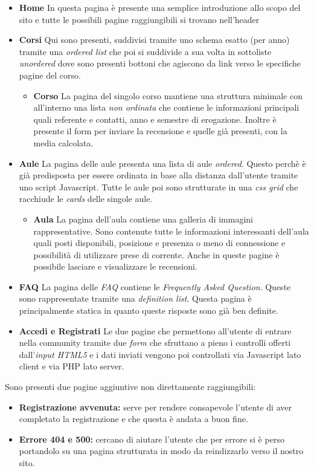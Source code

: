 \begin{itemize}
    \item \textbf{Home} In questa pagina è presente una semplice introduzione allo scopo del sito e tutte le possibili pagine raggiungibili si trovano nell'header
    \item \textbf{Corsi} Qui sono presenti, suddivisi tramite uno schema esatto (per anno) tramite una \textit{ordered list} che poi si suddivide a sua volta in sottoliste \textit{unordered} dove sono presenti bottoni che agiscono da link verso le specifiche pagine del corso.
    \begin{itemize}
        \item \textbf{Corso} La pagina del singolo corso mantiene una struttura minimale con all'interno una lista \textit{non ordinata} che contiene le informazioni principali quali referente e contatti, anno e semestre di erogazione. Inoltre è presente il form per inviare la recensione e quelle già presenti, con la media calcolata.
    \end{itemize}
    \item \textbf{Aule} La pagina delle aule presenta una lista di aule \textit{ordered}. Questo perchè è già predisposta per essere ordinata in base alla distanza dall'utente tramite uno script Javascript. Tutte le aule poi sono strutturate in una \textit{css grid} che racchiude le \textit{cards} delle singole aule.
    \begin{itemize}
        \item \textbf{Aula} La pagina dell'aula contiene una galleria di immagini rappresentative. Sono contenute tutte le informazioni interessanti dell'aula quali posti disponibili, posizione e presenza o meno di connessione e possibilità di utilizzare prese di corrente. Anche in queste pagine è possibile lasciare e visualizzare le recensioni.
    \end{itemize}
    \item \textbf{FAQ} La pagina delle \textit{FAQ} contiene le \textit{Frequently Asked Question}. Queste sono rappresentate tramite una \textit{definition list}. Questa pagina è principalmente statica in quanto queste risposte sono già ben definite.
    \item \textbf{Accedi e Registrati} Le due pagine che permettono all'utente di entrare nella community tramite due \textit{form} che sfruttano a pieno i controlli offerti dall'\textit{input HTML5} e i dati inviati vengono poi controllati via Javascript lato client e via PHP lato server.
\end{itemize}
Sono presenti due pagine aggiuntive non direttamente raggiungibili:
\begin{itemize}
    \item \textbf{Registrazione avvenuta:} serve per rendere consapevole l'utente di aver completato la registrazione e che questa è andata a buon fine.
    \item \textbf{Errore 404 e 500:} cercano di aiutare l'utente che per errore si è perso portandolo su una pagina strutturata in modo da reindizzarlo verso il nostro sito.
\end{itemize}


